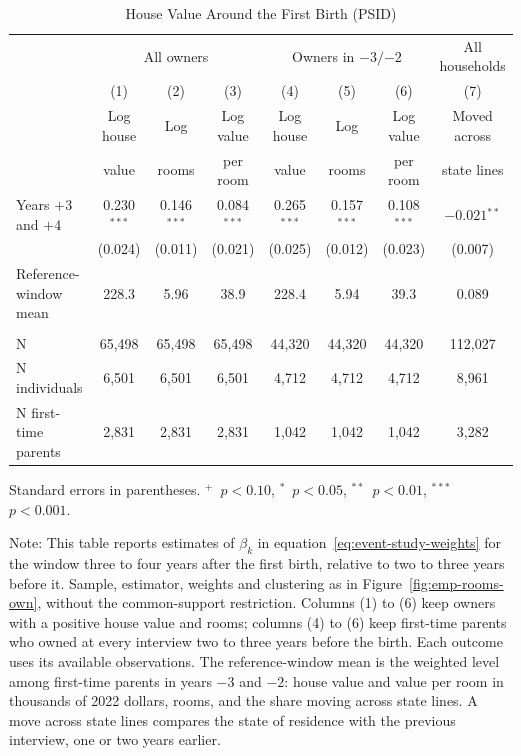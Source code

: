 \begin{table}[H]
\centering
\caption{House Value Around the First Birth (PSID)}
\label{tab:app-house-value}
\footnotesize
\setlength{\tabcolsep}{4pt}
\begin{tabular}{@{}l ccccccc@{}}
\toprule
 & \multicolumn{3}{c}{All owners} & \multicolumn{3}{c}{Owners in $-3/{-2}$} & All households \\
\cmidrule(lr){2-4}\cmidrule(lr){5-7}\cmidrule(lr){8-8}
 & (1) & (2) & (3) & (4) & (5) & (6) & (7) \\
 & Log house & Log & Log value & Log house & Log & Log value & Moved across \\
 & value & rooms & per room & value & rooms & per room & state lines \\
\midrule
Years $+3$ and $+4$ & 0.230$^{***}$ & 0.146$^{***}$ & 0.084$^{***}$ & 0.265$^{***}$ & 0.157$^{***}$ & 0.108$^{***}$ & $-0.021$$^{**}$ \\
 & (0.024) & (0.011) & (0.021) & (0.025) & (0.012) & (0.023) & (0.007) \\
Reference-window mean & 228.3 & 5.96 & 38.9 & 228.4 & 5.94 & 39.3 & 0.089 \\
\addlinespace
\multicolumn{8}{@{}l}{\textit{Observations}} \\
N & 65,498 & 65,498 & 65,498 & 44,320 & 44,320 & 44,320 & 112,027 \\
N individuals & 6,501 & 6,501 & 6,501 & 4,712 & 4,712 & 4,712 & 8,961 \\
N first-time parents & 2,831 & 2,831 & 2,831 & 1,042 & 1,042 & 1,042 & 3,282 \\
\bottomrule
\end{tabular}
\par\smallskip
\begin{minipage}{0.97\linewidth}
\footnotesize Standard errors in parentheses. $^{+}$~$p<0.10$, $^{*}$~$p<0.05$, $^{**}$~$p<0.01$, $^{***}$~$p<0.001$.

\smallskip
Note: This table reports estimates of $\beta_k$ in
equation~\eqref{eq:event-study-weights} for the window three to four years
after the first birth, relative to two to three years before it. Sample,
estimator, weights and clustering as in Figure~\ref{fig:emp-rooms-own},
without the common-support restriction. Columns (1) to (6) keep owners with a
positive house value and rooms; columns (4) to (6) keep first-time parents who
owned at every interview two to three years before the birth. Each outcome
uses its available observations. The reference-window mean is the weighted
level among first-time parents in years $-3$ and $-2$: house value and value
per room in thousands of 2022 dollars, rooms, and the share moving across
state lines. A move across state lines compares the state of residence with
the previous interview, one or two years earlier.
\end{minipage}
\end{table}

